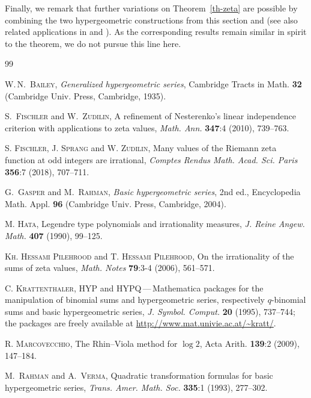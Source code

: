 \documentclass[12pt,reqno]{amsart}
\begin{document}
Finally, we remark that further variations on Theorem~\ref{th-zeta} are possible by combining the two hypergeometric
constructions from this section and \cite{Zu18} (see also related applications in \cite{FSZ18} and \cite{RZ18}).
As the corresponding results remain similar in spirit to the theorem, we do not pursue this line here.

\begin{thebibliography}{99}

\textsc{W.\,N.~Bailey},
\emph{Generalized hypergeometric series},
Cambridge Tracts in Math. \textbf{32}
(Cambridge Univ. Press, Cambridge, 1935).

\textsc{S.~Fischler} and \textsc{W.~Zudilin},
A refinement of Nesterenko's linear independence criterion with applications to zeta values,
\emph{Math. Ann.} \textbf{347}:4 (2010), 739--763.

\textsc{S. Fischler}, \textsc{J. Sprang} and \textsc{W. Zudilin},
Many values of the Riemann zeta function at odd integers are irrational,
\emph{Comptes Rendus Math. Acad. Sci. Paris} \textbf{356}:7 (2018), 707--711.

\textsc{G.~Gasper} and \textsc{M.~Rahman},
\emph{Basic hypergeometric series}, 2nd ed.,
Encyclopedia Math. Appl. \textbf{96}
(Cambridge Univ. Press, Cambridge, 2004).

\textsc{M. Hata},
Legendre type polynomials and irrationality measures,
\emph{J. Reine Angew. Math.} \textbf{407} (1990), 99--125.

\textsc{Kh. Hessami Pilehrood} and \textsc{T. Hessami Pilehrood},
On the irrationality of the sums of zeta values,
\emph{Math. Notes} \textbf{79}:3-4 (2006), 561--571.

\textsc{C. Krattenthaler},
HYP and HYPQ\,---\,Mathematica packages for the manipulation of binomial sums and hypergeometric
series, respectively $q$-binomial sums and basic hypergeometric series,
\emph{J. Symbol. Comput.} \textbf{20} (1995), 737--744;
the packages are freely available at \url{http://www.mat.univie.ac.at/~kratt/}.

\textsc{R. Marcovecchio},
The Rhin--Viola method for $\log2$,
Acta Arith. \textbf{139}:2 (2009), 147--184.

\textsc{M.~Rahman} and \textsc{A.~Verma},
Quadratic transformation formulas for basic hypergeometric series,
\emph{Trans. Amer. Math. Soc.} \textbf{335}:1 (1993), 277--302.


\end{thebibliography}
\end{document}
